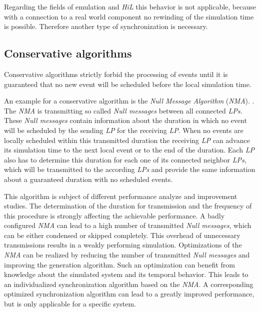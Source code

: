 Regarding the fields of emulation and \emph{HiL} this behavior is not applicable, because with a connection to a real world component no rewinding of the simulation time is possible.
Therefore another type of synchronization is necessary.
    
\subsection{Conservative algorithms}
\label{sec:parallel_synchronization_conservative}
Conservative algorithms strictly forbid the processing of events until it is guaranteed that no new event will be scheduled before the local simulation time.

An example for a conservative algorithm is the \emph{Null Message Algorithm} (\emph{NMA}). \cite[section 2.1]{bagrodia_performance_2000}.
The \emph{NMA} is transmitting so called \emph{Null messages} between all connected \emph{LPs}.
These \emph{Null messages} contain information about the duration in which no event will be scheduled by the sending \emph{LP} for the receiving \emph{LP}.
When no events are locally scheduled within this transmitted duration the receiving \emph{LP} can advance its simulation time to the next local event or to the end of the duration.
Each \emph{LP} also has to determine this duration for each one of its connected neighbor \emph{LPs}, which will be transmitted to the according \emph{LPs} and provide the same information about a guaranteed duration with no scheduled events.\cite[section 3]{kumar_study_1993}

This algorithm is subject of different performance analyze and improvement studies. \cite{kumar_study_1993} \cite{rizvi_reducing_2008} \cite{Varga03apractical}
The determination of the duration for transmission and the frequency of this procedure is strongly affecting the achievable performance.
A badly configured \emph{NMA} can lead to a high number of transmitted \emph{Null messages}, which can be either condensed or skipped completely.
This overhead of unnecessary transmissions results in a weakly performing simulation.
Optimizations of the \emph{NMA} can be realized by reducing the number of transmitted \emph{Null messages} and improving the generation algorithm. \cite{de_vries_reducing_1990}
Such an optimization can benefit from knowledge about the simulated system and its temporal behavior.
This leads to an individualized synchronization algorithm based on the \emph{NMA}.
A corresponding optimized synchronization algorithm can lead to a greatly improved performance, but is only applicable for a specific system.
\\

